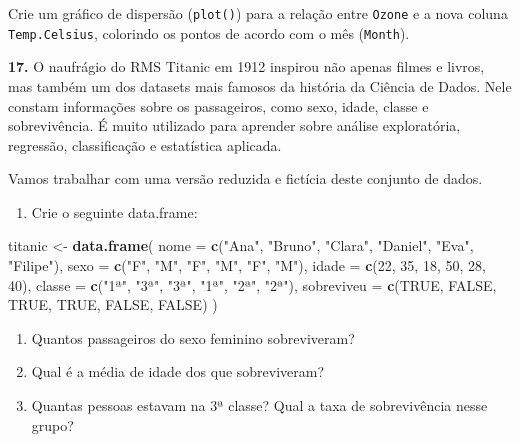 \documentclass[
]{book}
\newenvironment{Shaded}{\begin{snugshade}}{\end{snugshade}}
\newcommand{\AttributeTok}[1]{\textcolor[rgb]{0.13,0.29,0.53}{#1}}
\newcommand{\ConstantTok}[1]{\textcolor[rgb]{0.56,0.35,0.01}{#1}}
\newcommand{\DecValTok}[1]{\textcolor[rgb]{0.00,0.00,0.81}{#1}}
\newcommand{\FunctionTok}[1]{\textcolor[rgb]{0.13,0.29,0.53}{\textbf{#1}}}
\newcommand{\NormalTok}[1]{#1}
\newcommand{\OtherTok}[1]{\textcolor[rgb]{0.56,0.35,0.01}{#1}}
\newcommand{\StringTok}[1]{\textcolor[rgb]{0.31,0.60,0.02}{#1}}
\providecommand{\tightlist}{%
  \setlength{\itemsep}{0pt}\setlength{\parskip}{0pt}}
\begin{document}
Crie um gráfico de dispersão (\texttt{plot()}) para a relação entre \texttt{Ozone} e a nova coluna \texttt{Temp.Celsius}, colorindo os pontos de acordo com o mês (\texttt{Month}).

\textbf{17.} O naufrágio do RMS Titanic em 1912 inspirou não apenas filmes e livros, mas também um dos datasets mais famosos da história da Ciência de Dados. Nele constam informações sobre os passageiros, como sexo, idade, classe e sobrevivência. É muito utilizado para aprender sobre análise exploratória, regressão, classificação e estatística aplicada.

Vamos trabalhar com uma versão reduzida e fictícia deste conjunto de dados.

\begin{enumerate}
\def\labelenumi{(\alph{enumi})}
\tightlist
\item
  Crie o seguinte data.frame:
\end{enumerate}

\begin{Shaded}
\begin{Highlighting}[]
\NormalTok{titanic }\OtherTok{\textless{}{-}} \FunctionTok{data.frame}\NormalTok{(}
  \AttributeTok{nome =} \FunctionTok{c}\NormalTok{(}\StringTok{"Ana"}\NormalTok{, }\StringTok{"Bruno"}\NormalTok{, }\StringTok{"Clara"}\NormalTok{, }\StringTok{"Daniel"}\NormalTok{, }\StringTok{"Eva"}\NormalTok{, }\StringTok{"Filipe"}\NormalTok{),}
  \AttributeTok{sexo =} \FunctionTok{c}\NormalTok{(}\StringTok{"F"}\NormalTok{, }\StringTok{"M"}\NormalTok{, }\StringTok{"F"}\NormalTok{, }\StringTok{"M"}\NormalTok{, }\StringTok{"F"}\NormalTok{, }\StringTok{"M"}\NormalTok{),}
  \AttributeTok{idade =} \FunctionTok{c}\NormalTok{(}\DecValTok{22}\NormalTok{, }\DecValTok{35}\NormalTok{, }\DecValTok{18}\NormalTok{, }\DecValTok{50}\NormalTok{, }\DecValTok{28}\NormalTok{, }\DecValTok{40}\NormalTok{),}
  \AttributeTok{classe =} \FunctionTok{c}\NormalTok{(}\StringTok{"1ª"}\NormalTok{, }\StringTok{"3ª"}\NormalTok{, }\StringTok{"3ª"}\NormalTok{, }\StringTok{"1ª"}\NormalTok{, }\StringTok{"2ª"}\NormalTok{, }\StringTok{"2ª"}\NormalTok{),}
  \AttributeTok{sobreviveu =} \FunctionTok{c}\NormalTok{(}\ConstantTok{TRUE}\NormalTok{, }\ConstantTok{FALSE}\NormalTok{, }\ConstantTok{TRUE}\NormalTok{, }\ConstantTok{TRUE}\NormalTok{, }\ConstantTok{FALSE}\NormalTok{, }\ConstantTok{FALSE}\NormalTok{)}
\NormalTok{)}
\end{Highlighting}
\end{Shaded}

\begin{enumerate}
\def\labelenumi{(\alph{enumi})}
\setcounter{enumi}{1}
\item
  Quantos passageiros do sexo feminino sobreviveram?
\item
  Qual é a média de idade dos que sobreviveram?
\item
  Quantas pessoas estavam na 3ª classe? Qual a taxa de sobrevivência nesse grupo?
\end{enumerate}
\end{document}
